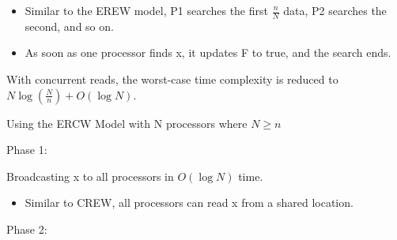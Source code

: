 \documentclass[a4paper, 10pt]{book}
\begin{document}
\begin{tcolorbox}[colback=white, colframe=black!25, title=Example]
\begin{minipage}{0.49\linewidth}
\begin{tcolorbox}[colframe=white, size=small]
                                \begin{itemize}
                                    
                                    \item Similar to the EREW model, P1 searches the first $\frac{n}{N}$ data, P2 searches the second, and so on.
    
                                    \item As soon as one processor finds x, it updates F to true, and the search ends.
    
                                \end{itemize}
    
                                With concurrent reads, the worst-case time complexity is reduced to $N\log (\frac{N}{n})+O(\log N)$.
    
                            \end{tcolorbox}
                        \end{minipage}
    
                        \begin{minipage}{0.49\linewidth} %
                            \footnotesize
                            \vspace{0.3cm}
                            \begin{tcolorbox}[colframe=white, size=small]
    
                                {\bold Using the ERCW Model with N processors where $N\geq n$}
    
                                \vspace{0.3cm}

                                {\bold Phase 1:}
                                
                                Broadcasting x to all processors in $O(\log N)$ time.
    
                                \begin{itemize}
                                    
                                    \item Similar to CREW, all processors can read x from a shared location.
    
                                \end{itemize}
    
                                {\bold Phase 2:}
                                

\end{tcolorbox}
\end{minipage}
\end{tcolorbox}
\end{document}
